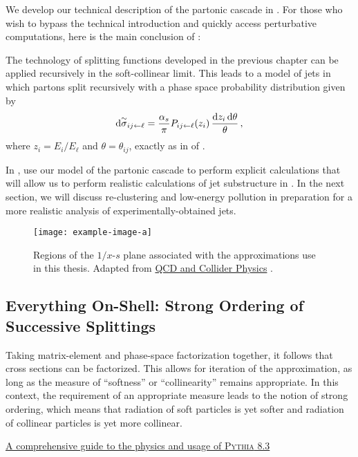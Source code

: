 We develop our technical description of the partonic cascade in .
%
For those who wish to bypass the technical introduction and quickly access perturbative computations, here is the main conclusion of :
\begin{answer}
    The technology of splitting functions developed in the previous chapter can be applied recursively in the soft-collinear limit.
    This leads to a model of jets in which partons split recursively with a phase space probability distribution given by
    \begin{align}
        \dd \overset{\sim}{\sigma}_{ij\leftarrow \ell}
        =
        \frac{\alpha_s}{\pi}
        P_{ij \leftarrow \ell}(z_i)\,\frac{\dd z_i \, \dd \theta}{\theta}
        \,,
    \end{align}
    where \(z_i = E_i / E_\ell\) and \(\theta = \theta_{ij}\), exactly as in  of .
\end{answer}
In , use our model of the partonic cascade to perform explicit calculations that will allow us to perform realistic calculations of jet substructure in .
%
In the next section, we will discuss re-clustering and low-energy pollution in preparation for a more realistic analysis of experimentally-obtained jets.



\begin{figure}[t!]
    \centering
    \texttt{[image: example-image-a]}
    \caption[
        Regions of the \(1/z\)-\(s\) plane associated with our approximations.
        Adapted from  
    ]
    {
        Regions of the \(1/x\)-\(s\) plane associated with the approximations use in this thesis.
        Adapted from \underline{QCD and Collider Physics} \cite{Collins:1984xc}.  
    }
    \label{fig:dlla-plane}
\end{figure}


\subsection{Everything On-Shell: Strong Ordering of Successive Splittings}
\label{sec:everything-on-shell}

\epigraph{Taking matrix-element and phase-space factorization together, it follows that cross sections can be factorized. This allows for iteration of the approximation, as long as the measure of “softness” or “collinearity” remains appropriate. In this context, the requirement of an appropriate measure leads to the notion of strong ordering, which means that radiation of soft particles is yet softer and radiation of collinear particles is yet more collinear.}{\underline{A comprehensive guide to the physics and usage of \textsc{Pythia} 8.3} \cite{Bierlich:2022pfr}}

